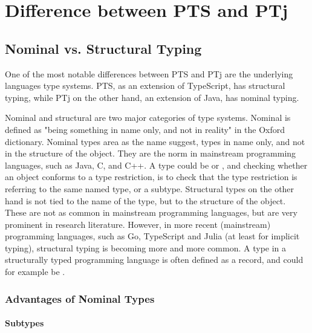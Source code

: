 
\chapter{Difference between PTS and PTj}\label{ch:difference-between-pts-and-ptj}


\section{Nominal vs. Structural Typing}\label{sec:nominal-vs-structural-typing}


One of the most notable differences between PTS and PTj are the underlying languages type systems.
PTS, as an extension of TypeScript, has structural typing, while PTj on the other hand, an extension of Java, has nominal typing.

Nominal and structural are two major categories of type systems.
Nominal is defined as "being something in name only, and not in reality" in the Oxford dictionary.
Nominal types area as the name suggest, types in name only, and not in the structure of the object.
They are the norm in mainstream programming languages, such as Java, C, and C++.
A type could be  or , and checking whether an object conforms to a type restriction, is to check that the type restriction is referring to the same named type, or a subtype.
Structural types on the other hand is not tied to the name of the type, but to the structure of the object.
These are not as common in mainstream programming languages, but are very prominent in research literature.
However, in more recent (mainstream) programming languages, such as Go, TypeScript and Julia (at least for implicit typing), structural typing is becoming more and more common.
A type in a structurally typed programming language is often defined as a record, and could for example be .

\subsection{Advantages of Nominal Types}\label{subsec:advantages-of-nominal-types}

\subsubsection{Subtypes}\label{subsubsec:subtypes}

